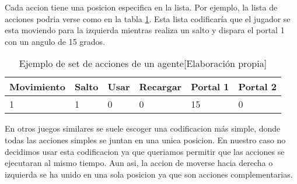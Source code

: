 Cada accion tiene una posicion especifica en la lista. Por ejemplo, la lista de acciones podria verse como en la tabla \ref {tab:accion}. Esta lista codificaría que el jugador se esta moviendo para la izquierda mientras realiza un salto y dispara el portal 1 con un angulo de 15 grados.

\begin{table}[h]
	\begin{center}
		\begin{tabular}{| l | l | l | l | l | l |}
			\hline
			\textbf{Movimiento} & \textbf{Salto} & \textbf{Usar} & \textbf{Recargar} & \textbf{Portal 1} & \textbf{Portal 2} \\ \hline
			1                   & 1              & 0             & 0                 & 15                & 0                 \\ \hline
		\end{tabular}
		\caption{Ejemplo de set de acciones de un agente[Elaboración propia]}
		\label{tab:accion}
	\end{center}
\end{table}


En otros juegos similares se suele escoger una codificacion más simple, donde todas las acciones simples se juntan en una unica posicion. En nuestro caso no decidimos usar esta codificacion ya que queriamos permitir que las acciones se ejecutaran al mismo tiempo. Aun asi, la accion de moverse hacia derecha o izquierda se ha unido en una sola posicion ya que son acciones complementarias.